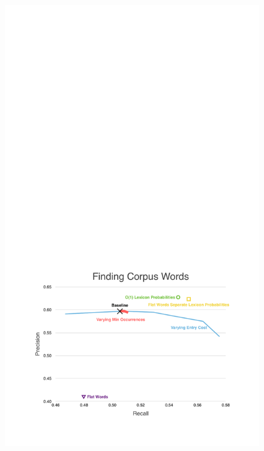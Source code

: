 \documentclass[11pt, oneside, fleqn]{article}
\begin{document}
  \begin{figure}[h]
  \includegraphics{./figure/finding_corpus_word.pdf}
  \end{figure}
\end{document}
